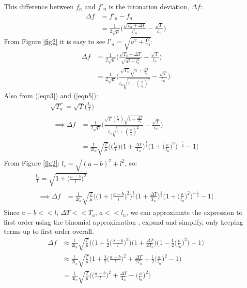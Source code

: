 This difference between $f_n$ and $f'_n$ is the intonation deviation, $\Delta f$:
\begin{align}
    \Delta f &= f'_n - f_n \\
    &= \frac{1}{2\sqrt{\mu}} \bigg(\frac{\sqrt{T_a + \Delta T}}{l'_n} - \frac{\sqrt{T}}{l_n} \bigg)
\end{align}
From Figure \ref{fig2} it is easy to see $l'_n = \sqrt{a^2 + l_n^2}$:
\begin{align}
    \Delta f &= \frac{1}{2\sqrt{\mu}} \bigg(\frac{\sqrt{T_a + \Delta T}}{\sqrt{a^2 + l_n^2}} - \frac{\sqrt{T}}{l_n} \bigg) \\
    &= \frac{1}{2\sqrt{\mu}} \bigg(\frac{\sqrt{T_a}  \sqrt{1 + \frac{\Delta T}{T_a} }}{l_n \sqrt{1 + (\frac{a}{l_n})^2}} - \frac{\sqrt{T}}{l_n} \bigg)
\end{align}
Also from (\ref{eqn3}) and (\ref{eqn5}):
\begin{gather}
    \sqrt{T_a} = \sqrt{T} \bigg(\frac{l_s}{l}\bigg) \label{eqn11} \\ 
    \begin{align}
        \implies \Delta f &= \frac{1}{2\sqrt{\mu}} \Bigg(\frac{ \sqrt{T} (\frac{l_s}{l}) \sqrt{1 + \frac{\Delta T}{T_a} }}{l_n \sqrt{1 + (\frac{a}{l_n})^2}} - \frac{\sqrt{T}}{l_n} \Bigg) \\
        &= \frac{1}{2l_n} \sqrt{\frac{T}{\mu}} \Bigg(\bigg(\frac{l_s}{l}\bigg) \bigg(1 + \frac{\Delta T}{T_a}\bigg)^\frac{1}{2} \bigg(1 + \bigg(\frac{a}{l_n}\bigg)^2 \bigg)^{-\frac{1}{2}} - 1 \Bigg)
    \end{align}
\end{gather}
From Figure \ref{fig2}: $l_s = \sqrt{(a-b)^2 + l^2}$, so:
\begin{gather*}
    \frac{l_s}{l} = \sqrt{1 + \bigg(\frac{a-b}{l}\bigg)^2}\\
    \begin{align}
        \implies \Delta f &= \frac{1}{2l_n} \sqrt{\frac{T}{\mu}} \Bigg(\bigg( 1 + \bigg(\frac{a-b}{l}\bigg)^2\bigg)^\frac{1}{2} \bigg(1 + \frac{\Delta T}{T_a}\bigg)^\frac{1}{2} \bigg(1 + \bigg(\frac{a}{l_n}\bigg)^2\bigg)^{-\frac{1}{2}} - 1 \Bigg)
    \end{align}
\end{gather*}
Since $a-b << l$, $\Delta T << T_a$, $a << l_n$, we can approximate the expression to first order using the binomial approximation \cite{spakula}, expand and simplify, only keeping terms up to first order overall.
\begin{align}
    \Delta f &\approx \frac{1}{2l_n} \sqrt{\frac{T}{\mu}} \Bigg(\bigg( 1 + \frac{1}{2}\bigg(\frac{a-b}{l}\bigg)^2 \bigg) \bigg(1 + \frac{\Delta T}{2T_a}\bigg) \bigg(1 - \frac{1}{2} \bigg(\frac{a}{l_n}\bigg)^2\bigg) - 1 \Bigg) \\
    &\approx \frac{1}{2l_n} \sqrt{\frac{T}{\mu}} \Bigg(1 + \frac{1}{2}\bigg(\frac{a-b}{l}\bigg)^2 + \frac{\Delta T}{2T_a} - \frac{1}{2} \bigg(\frac{a}{l_n}\bigg)^2 - 1 \Bigg) \\
    &= \frac{1}{4l_n} \sqrt{\frac{T}{\mu}} \Bigg( \bigg(\frac{a-b}{l}\bigg)^2 + \frac{\Delta T}{T_a} - \bigg(\frac{a}{l_n}\bigg)^2 \Bigg) \label{eqn17}
\end{align}